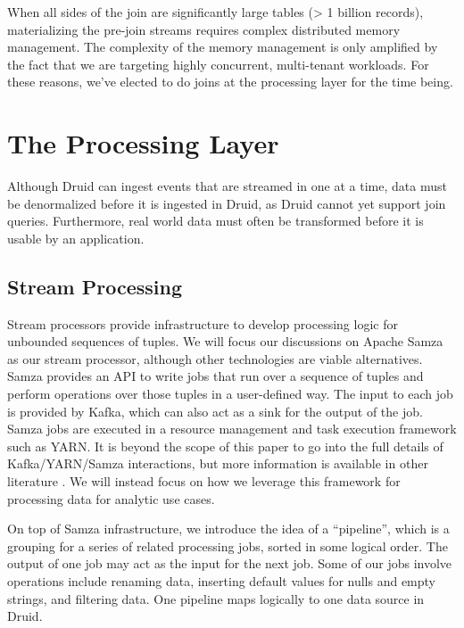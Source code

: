 \documentclass{vldb}
\begin{document}
When all sides of the join are significantly large tables (> 1 billion
records), materializing the pre-join streams requires complex distributed
memory management. The complexity of the memory management is only amplified by
the fact that we are targeting highly concurrent, multi-tenant workloads. For
these reasons, we’ve elected to do joins at the processing layer for the time
being.

\section{The Processing Layer}
\label{sec:processing}
Although Druid can ingest events that are streamed in one at a time, data must
be denormalized before it is ingested in Druid, as Druid cannot yet support
join queries. Furthermore, real world data must often be transformed before it
is usable by an application.

\subsection{Stream Processing}
\label{sec:streamprocessing}
Stream processors provide infrastructure to develop processing logic for
unbounded sequences of tuples. We will focus our discussions on Apache Samza as
our stream processor, although other technologies are viable alternatives.
Samza provides an API to write jobs that run over a sequence of tuples and
perform operations over those tuples in a user-defined way. The input to each
job is provided by Kafka, which can also act as a sink for the output of the
job. Samza jobs are executed in a resource management and task execution
framework such as YARN\cite{vavilapalli2013apache}. It is beyond the scope of
this paper to go into the full details of Kafka/YARN/Samza interactions, but
more information is available in other literature \cite{2014samza}. We will
instead focus on how we leverage this framework for processing data for
analytic use cases.

On top of Samza infrastructure, we introduce the idea of a “pipeline”, which is
a grouping for a series of related processing jobs, sorted in some logical
order. The output of one job may act as the input for the next job. Some of our
jobs involve operations include renaming data, inserting default values for
nulls and empty strings, and filtering data. One pipeline maps logically to one
data source in Druid.
\end{document}
